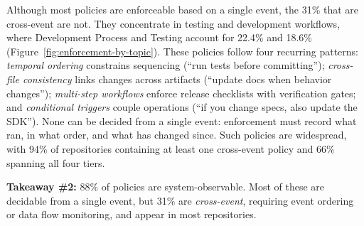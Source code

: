 Although most policies are enforceable based on a single event, the 31\% that are cross-event are not. They concentrate in testing and development workflows, where Development Process and Testing account for 22.4\% and 18.6\% (Figure~\ref{fig:enforcement-by-topic}). These policies follow four recurring patterns: \emph{temporal ordering} constrains sequencing (``run tests before committing''); \emph{cross-file consistency} links changes across artifacts (``update docs when behavior changes''); \emph{multi-step workflows} enforce release checklists with verification gates; and \emph{conditional triggers} couple operations (``if you change specs, also update the SDK''). None can be decided from a single event: enforcement must record what ran, in what order, and what has changed since. Such policies are widespread, with 94\% of repositories containing at least one cross-event policy and 66\% spanning all four tiers.

\begin{tcolorbox}[colback=blue!5!white,colframe=gray!75!black,left=1mm, right=1mm, top=0.5mm, bottom=0.5mm, arc=1mm]
\textbf{Takeaway \#2:} 88\% of policies are system-observable. Most of these are decidable from a single event, but 31\% are \emph{cross-event}, requiring event ordering or data flow monitoring, and appear in most repositories.
\end{tcolorbox}


